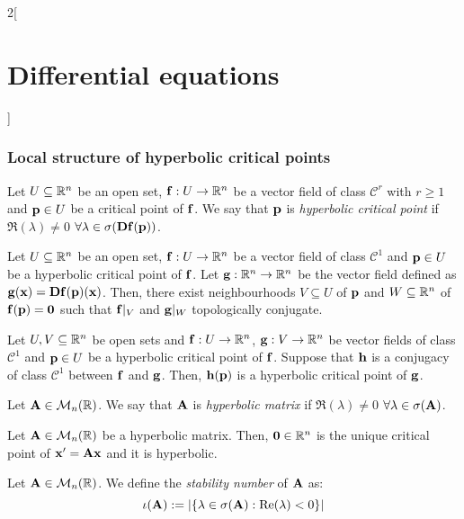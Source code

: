 \documentclass[../../../main.tex]{subfiles}
\begin{document}
\begin{multicols}{2}[\section{Differential equations}]
  \subsubsection{Local structure of hyperbolic critical points}
  \begin{definition}
    Let $U\subseteq \mathbb{R}^n$ be an open set, $\boldsymbol{\mathrm{f}}:U\rightarrow\mathbb{R}^n$ be a vector field of class $\mathcal{C}^r$ with $r\geq 1$ and $\boldsymbol{\mathrm{p}}\in U$ be a critical point of $\boldsymbol{\mathrm{f}}$. We say that $\boldsymbol{\mathrm{p}}$ is \emph{hyperbolic critical point} if $\Re(\lambda)\ne 0$ $\forall \lambda\in\sigma(\boldsymbol{\mathrm{Df}}(\boldsymbol{\mathrm{p}}))$.
  \end{definition}
  \begin{theorem}
    Let $U\subseteq \mathbb{R}^n$ be an open set, $\boldsymbol{\mathrm{f}}:U\rightarrow\mathbb{R}^n$ be a vector field of class $\mathcal{C}^1$ and $\boldsymbol{\mathrm{p}}\in U$ be a hyperbolic critical point of $\boldsymbol{\mathrm{f}}$. Let $\boldsymbol{\mathrm{g}}:\mathbb{R}^n\rightarrow\mathbb{R}^n$ be the vector field defined as $\boldsymbol{\mathrm{g}}(\boldsymbol{\mathrm{x}})=\boldsymbol{\mathrm{Df}}(\boldsymbol{\mathrm{p}})(\boldsymbol{\mathrm{x}})$. Then, there exist neighbourhoods $V\subseteq U$ of $\boldsymbol{\mathrm{p}}$ and $W\subseteq \mathbb{R}^n$ of $\boldsymbol{\mathrm{f}}(\boldsymbol{\mathrm{p}})=\boldsymbol{\mathrm{0}}$ such that $\boldsymbol{\mathrm{f}}|_V$ and $\boldsymbol{\mathrm{g}}|_W$ topologically conjugate.
  \end{theorem}
  \begin{corollary}
    Let $U,V\subseteq \mathbb{R}^n$ be open sets and $\boldsymbol{\mathrm{f}}:U\rightarrow\mathbb{R}^n$, $\boldsymbol{\mathrm{g}}:V\rightarrow\mathbb{R}^n$ be vector fields of class $\mathcal{C}^1$ and $\boldsymbol{\mathrm{p}}\in U$ be a hyperbolic critical point of $\boldsymbol{\mathrm{f}}$. Suppose that $\boldsymbol{\mathrm{h}}$ is a conjugacy of class $\mathcal{C}^1$ between $\boldsymbol{\mathrm{f}}$ and $\boldsymbol{\mathrm{g}}$. Then, $\boldsymbol{\mathrm{h}}(\boldsymbol{\mathrm{p}})$ is a hyperbolic critical point of $\boldsymbol{\mathrm{g}}$.
  \end{corollary}
  \begin{definition}
    Let $\boldsymbol{\mathrm{A}}\in\mathcal{M}_n(\mathbb{R})$. We say that $\boldsymbol{\mathrm{A}}$ is \emph{hyperbolic matrix} if $\Re(\lambda)\ne 0$ $\forall\lambda\in\sigma(\boldsymbol{\mathrm{A}})$.
  \end{definition}
  \begin{proposition}
    Let $\boldsymbol{\mathrm{A}}\in\mathcal{M}_n(\mathbb{R})$ be a hyperbolic matrix. Then, $\boldsymbol{\mathrm{0}}\in\mathbb{R}^n$ is the unique critical point of $\boldsymbol{\mathrm{x}}'=\boldsymbol{\mathrm{A}}\boldsymbol{\mathrm{x}}$ and it is hyperbolic.
  \end{proposition}
  \begin{definition}
    Let $\boldsymbol{\mathrm{A}}\in\mathcal{M}_n(\mathbb{R})$. We define the \emph{stability number} of $\boldsymbol{\mathrm{A}}$ as: $$\iota(\boldsymbol{\mathrm{A}}):=|\{\lambda\in\sigma(\boldsymbol{\mathrm{A}}):\Re(\lambda)<0\}|$$
  \end{definition}
  \begin{theorem}

\end{theorem}
\end{multicols}
\end{document}
